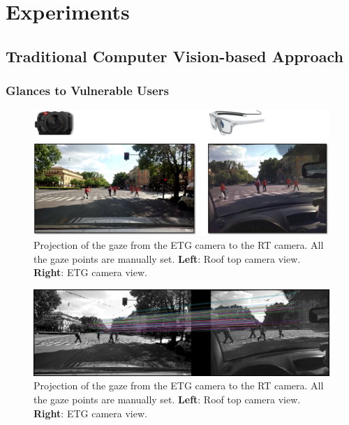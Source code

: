 \chapter{Experiments}
\label{chpt:experiments}

\section{Traditional Computer Vision-based Approach}
\label{sec:exp_traditional_cv}

\subsection{Glances to Vulnerable Users}
\begin{figure}
    \centering
    \includegraphics[width=\textwidth]{images/dreyeve/gaze_projection.png}
    \caption[Projection of the gaze from the ETG camera to the RT camera.]
    {Projection of the gaze from the ETG camera to the RT camera. 
    All the gaze points are manually set.
    \textbf{Left}: Roof top camera view.
    \textbf{Right}: ETG camera view.}
    \label{fig:gaze_projection}
\end{figure}
\begin{figure}
    \centering
    \includegraphics[width=\textwidth]{images/dreyeve/gaze_matchings.png}
    \caption[Keypoints' matchings between the two cameras.]
    {Projection of the gaze from the ETG camera to the RT camera. 
    All the gaze points are manually set.
    \textbf{Left}: Roof top camera view.
    \textbf{Right}: ETG camera view.}
    \label{fig:gaze_matchings}
\end{figure}
